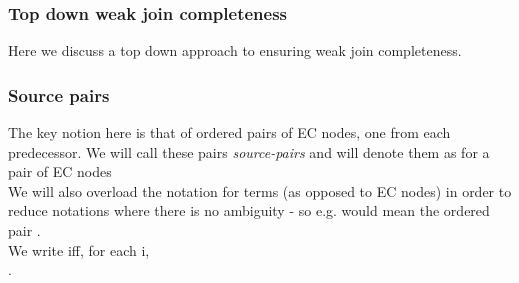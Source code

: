 \subsubsection{Top down weak join completeness}
Here we discuss a top down approach to ensuring weak join completeness.

\subsubsection*{Source pairs}
The key notion here is that of ordered pairs of EC nodes, one from each predecessor.
We will call these pairs \emph{source-pairs} and will denote them as  for a pair of EC nodes \\
We will also overload the notation for terms (as opposed to EC nodes) in order to reduce notations where there is no ambiguity - so e.g.  would mean the ordered pair .\\
We write  iff, for each i, \\
.

